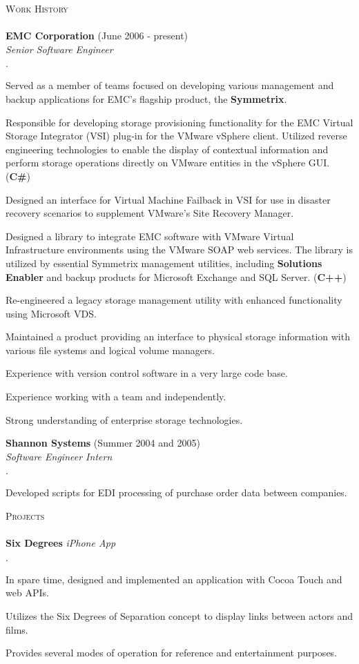 \documentclass[11pt]{article}
\newcommand{\mydot}{$\cdot$ }
\newcommand{\lineunder}{\vspace*{-8pt} \\ \hspace*{-18pt} \hrulefill \\}
\newcommand{\header}[1]{{\hspace*{-15pt}\vspace*{6pt} \textsc{#1}} \vspace*{-6pt} \lineunder}
\newcommand{\employer}[3]{\textbf{#1} (#2)\\ \emph{#3}\\  }
\newcommand{\project}[2]{\textbf{#1} \emph{#2}\\  }
\newenvironment{achievements}{\begin{list}{\mydot}{\topsep 0pt \itemsep -2pt}}{\vspace*{4pt}\end{list}}
\begin{document}
\header{Work History}
\employer{EMC Corporation}{June 2006 - present}{Senior Software Engineer}
\begin{achievements}
  \item Served as a member of teams focused on developing various management and backup applications for EMC's flagship product, the \textbf{Symmetrix}.
  \item Responsible for developing storage provisioning functionality for the EMC Virtual Storage Integrator (VSI) plug-in for the VMware vSphere client.  Utilized reverse engineering technologies to enable the display of contextual information and perform storage operations directly on VMware entities in the vSphere GUI. (\textbf{C\#})
  \item Designed an interface for Virtual Machine Failback in VSI for use in disaster recovery scenarios to supplement VMware's Site Recovery Manager.
  \item Designed a library to integrate EMC software with VMware Virtual Infrastructure environments using the VMware SOAP web services.  The library is utilized by essential Symmetrix management utilities, including \textbf{Solutions Enabler} and backup products for Microsoft Exchange and SQL Server. (\textbf{C++})
  \item Re-engineered a legacy storage management utility with enhanced functionality using Microsoft VDS.
  \item Maintained a product providing an interface to physical storage information with various file systems and logical volume managers.
  \item Experience with version control software in a very large code base.
  \item Experience working with a team and independently.
  \item Strong understanding of enterprise storage technologies.
\end{achievements}

\employer{Shannon Systems}{Summer 2004 and 2005}{Software Engineer Intern}
\begin{achievements}
  \item Developed scripts for EDI processing of purchase order data between companies.
\end{achievements}


\header{Projects}
\project{Six Degrees}{iPhone App}{
\begin{achievements}
  \item In spare time, designed and implemented an application with Cocoa Touch and web APIs.
  \item Utilizes the Six Degrees of Separation concept to display links between actors and films.
  \item Provides several modes of operation for reference and entertainment purposes.
\end{achievements}}
\end{document}
